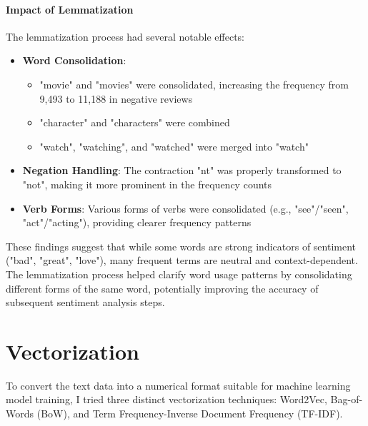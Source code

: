\documentclass[12pt]{article}
\begin{document}
\paragraph{Impact of Lemmatization}
The lemmatization process had several notable effects:
\begin{itemize}
    \item \textbf{Word Consolidation}: 
        \begin{itemize}
            \item "movie" and "movies" were consolidated, increasing the frequency from 9,493 to 11,188 in negative reviews
            \item "character" and "characters" were combined
            \item "watch", "watching", and "watched" were merged into "watch"
        \end{itemize}
    
    \item \textbf{Negation Handling}: The contraction "nt" was properly transformed to "not", making it more prominent in the frequency counts
    
    \item \textbf{Verb Forms}: Various forms of verbs were consolidated (e.g., "see"/"seen", "act"/"acting"), providing clearer frequency patterns
\end{itemize}

These findings suggest that while some words are strong indicators of sentiment ("bad", "great", "love"), many frequent terms are neutral and context-dependent. The lemmatization process helped clarify word usage patterns by consolidating different forms of the same word, potentially improving the accuracy of subsequent sentiment analysis steps.






\section{Vectorization}
To convert the text data into a numerical format suitable for machine learning model training, I tried three distinct vectorization techniques: Word2Vec, Bag-of-Words (BoW), and Term Frequency-Inverse Document Frequency (TF-IDF).
\end{document}
